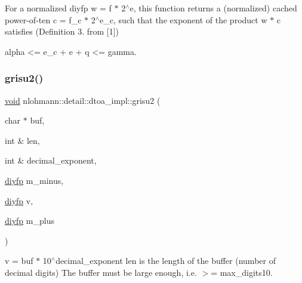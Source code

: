 For a normalized diyfp w = f $\ast$ 2$^\wedge$e, this function returns a (normalized) cached power-\/of-\/ten c = f\+\_\+c $\ast$ 2$^\wedge$e\+\_\+c, such that the exponent of the product w $\ast$ c satisfies (Definition 3. from \mbox{[}1\mbox{]}) \begin{DoxyVerb} alpha <= e_c + e + q <= gamma.\end{DoxyVerb}
 \mbox{\label{namespacenlohmann_1_1detail_1_1dtoa__impl_a05b681dcb8569b9784c6dccfadb01633}} 
\subsubsection{\texorpdfstring{grisu2()}{grisu2()}\hspace{0.1cm}{\footnotesize\ttfamily [1/2]}}
{\footnotesize\ttfamily \hyperlink{namespacenlohmann_1_1detail_a59fca69799f6b9e366710cb9043aa77d}{void} nlohmann\+::detail\+::dtoa\+\_\+impl\+::grisu2 (\begin{DoxyParamCaption}\item[{char $\ast$}]{buf,  }\item[{int \&}]{len,  }\item[{int \&}]{decimal\+\_\+exponent,  }\item[{\hyperlink{structnlohmann_1_1detail_1_1dtoa__impl_1_1diyfp}{diyfp}}]{m\+\_\+minus,  }\item[{\hyperlink{structnlohmann_1_1detail_1_1dtoa__impl_1_1diyfp}{diyfp}}]{v,  }\item[{\hyperlink{structnlohmann_1_1detail_1_1dtoa__impl_1_1diyfp}{diyfp}}]{m\+\_\+plus }\end{DoxyParamCaption})\hspace{0.3cm}{\ttfamily [inline]}}

v = buf $\ast$ 10$^\wedge$decimal\+\_\+exponent len is the length of the buffer (number of decimal digits) The buffer must be large enough, i.\+e. $>$= max\+\_\+digits10. \mbox{\label{namespacenlohmann_1_1detail_1_1dtoa__impl_aab7a9670a4f4704a5d0347ad7588576b}} 

